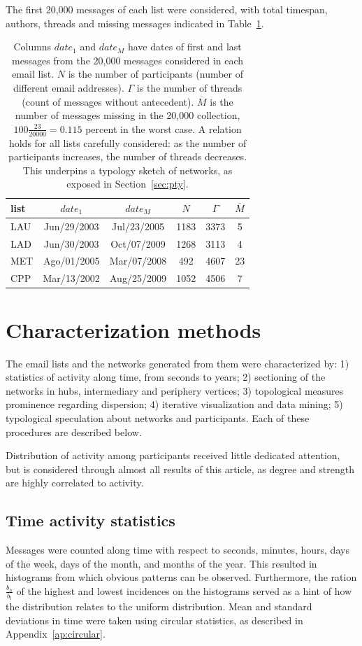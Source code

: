 \documentclass[%
 aip,
 jmp,%
 amsmath,amssymb,
 reprint,%
]{revtex4-1}
\begin{document}
 The first 20,000 messages of each list were considered, with total timespan, authors, threads and missing messages indicated in Table~\ref{tab:genLists}.

\begin{table}
  \centering
  \caption{Columns $date_1$ and $date_M$ have dates of first and last messages from the 20,000 messages considered in each email list.
$N$ is the number of participants (number of different email addresses).
$\Gamma$ is the number of threads (count of messages without antecedent).
$\overline{M}$ is the number of messages missing in the 20,000 collection, $100\frac{23}{20000}=0.115$ percent in the worst case.
A relation holds for all lists carefully considered: as the number of participants increases, the number of threads decreases.
This underpins a typology sketch of networks, as exposed in Section~\ref{sec:pty}.}
  \label{tab:genLists}
  \begin{tabular}{|l|c|c|c|c|c|}\hline
list & $date_1$ & $date_{M}$    & $N$  & $\Gamma$ & $\overline{M}$ \\\hline
LAU  & Jun/29/2003 & Jul/23/2005 & 1183 & 3373 & 5 \\
LAD  & Jun/30/2003 & Oct/07/2009 & 1268 & 3113 & 4 \\
MET  & Ago/01/2005 & Mar/07/2008 & 492  & 4607 & 23 \\
CPP  & Mar/13/2002 & Aug/25/2009 & 1052 & 4506 & 7 \\ \hline
  \end{tabular}
\end{table}


\section{Characterization methods}\label{sec:carac}
The email lists and the networks generated from them were characterized by: 1) statistics of activity along time, from seconds to years; 2) sectioning of the networks in hubs, intermediary and periphery vertices; 3) topological measures prominence regarding dispersion; 4) iterative visualization and data mining; 5) typological speculation about networks and participants.
Each of these procedures are described below.

Distribution of activity among participants received little dedicated attention, but is considered through almost all results of this article, as degree and strength are highly correlated to activity.

  \subsection{Time activity statistics}                          
  Messages were counted along time with respect to seconds, minutes, hours, days of the week, days of the month, and months of the year. This resulted in histograms from which obvious patterns can be observed. Furthermore, the ration $\frac{b_h}{b_l}$ of the highest and lowest incidences on the histograms served as a hint of how the distribution relates to the uniform distribution. Mean and standard deviations in time were taken using circular statistics, as described in Appendix~\ref{ap:circular}.
\end{document}
